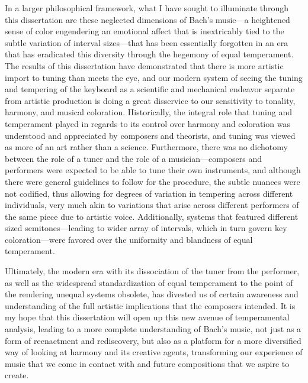 In a larger philosophical framework, what I have sought to illuminate
through this dissertation are these neglected dimensions of Bach's
music---a heightened sense of color engendering an emotional affect
that is inextricably tied to the subtle variation of interval
sizes---that has been essentially forgotten in an era that has
eradicated this diversity through the hegemony of equal temperament. The
results of this dissertation have demonstrated that there is more
artistic import to tuning than meets the eye, and our modern system of
seeing the tuning and tempering of the keyboard as a scientific and
mechanical endeavor separate from artistic production is doing a great
disservice to our sensitivity to tonality, harmony, and musical
coloration. Historically, the integral role that tuning and temperament
played in regards to its control over harmony and coloration was
understood and appreciated by composers and theorists, and tuning was
viewed as more of an art rather than a science. Furthermore, there was
no dichotomy between the role of a tuner and the role of a
musician---composers and performers were expected to be able to tune
their own instruments, and although there were general guidelines to
follow for the procedure, the subtle nuances were not codified, thus
allowing for degrees of variation in tempering across different
individuals, very much akin to variations that arise across different
performers of the same piece due to artistic voice. Additionally,
systems that featured different sized semitones---leading to wider array
of intervals, which in turn govern key coloration---were favored
over the uniformity and blandness of equal temperament.

Ultimately, the modern era with its dissociation of the tuner from the
performer, as well as the widespread standardization of equal
temperament to the point of the rendering unequal systems obsolete, has
divested us of certain awareness and understanding of the full artistic
implications that the composers intended. It is my hope that this
dissertation will open up this new avenue of temperamental analysis,
leading to a more complete understanding of Bach's music, not just as a
form of reenactment and rediscovery, but also as a platform for a more
diversified way of looking at harmony and its creative agents,
transforming our experience of music that we come in contact with and
future compositions that we aspire to create.


    
    
    
